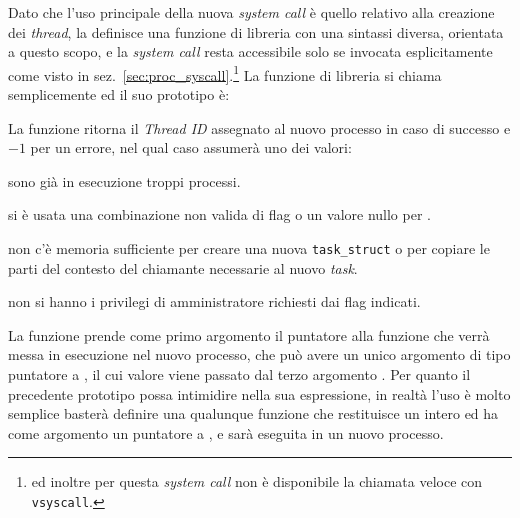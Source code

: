 Dato che l'uso principale della nuova \textit{system call} è quello relativo
alla creazione dei \textit{thread}, la  definisce una funzione di
libreria con una sintassi diversa, orientata a questo scopo, e la
\textit{system call} resta accessibile solo se invocata esplicitamente come
visto in sez.~\ref{sec:proc_syscall}.\footnote{ed inoltre per questa
  \textit{system call} non è disponibile la chiamata veloce con
  \texttt{vsyscall}.} La funzione di libreria si chiama semplicemente
 ed il suo prototipo è:

\begin{funcproto}{ 
}
{La funzione ritorna il \textit{Thread ID} assegnato al nuovo processo in caso
  di successo e $-1$ per un errore, nel qual caso  assumerà uno dei
  valori: 
\begin{errlist}
    \item[\errcode{EAGAIN}] sono già in esecuzione troppi processi.
    \item[\errcode{EINVAL}] si è usata una combinazione non valida di flag o
      un valore nullo per .
    \item[\errcode{ENOMEM}] non c'è memoria sufficiente per creare una nuova
      \texttt{task\_struct} o per copiare le parti del contesto del chiamante
      necessarie al nuovo \textit{task}.
    \item[\errcode{EPERM}] non si hanno i privilegi di amministratore
      richiesti dai flag indicati.
\end{errlist}}
\end{funcproto}


La funzione prende come primo argomento  il puntatore alla funzione
che verrà messa in esecuzione nel nuovo processo, che può avere un unico
argomento di tipo puntatore a , il cui valore viene passato dal
terzo argomento . Per quanto il precedente prototipo possa
intimidire nella sua espressione, in realtà l'uso è molto semplice basterà
definire una qualunque funzione  che restituisce un intero ed ha
come argomento un puntatore a , e  sarà eseguita in
un nuovo processo.

